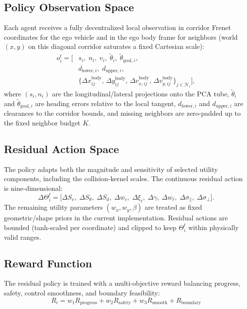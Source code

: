 \documentclass[conference]{IEEEtran}
\begin{document}
\subsection{Policy Observation Space}
Each agent receives a fully decentralized local observation in corridor Frenet coordinates for the ego vehicle and in the ego body frame for neighbors (world $(x,y)$ on this diagonal corridor saturates a fixed Cartesian scale):
\begin{equation}
\begin{aligned}
o_{i}^{t}
=
\Big[
&s_{i},\;n_{i},\;v_{i},\;\tilde\theta_{i},\;\tilde\theta_{\mathrm{goal},i},\\
&d_{\mathrm{lower},i},\;d_{\mathrm{upper},i},\\
&\big\{\Delta x^{\mathrm{body}}_{ij},\,\Delta y^{\mathrm{body}}_{ij},\,\Delta v_{x,ij}^{\mathrm{body}},\,\Delta v_{y,ij}^{\mathrm{body}}\big\}_{j\in\mathcal{N}_{i}}
\Big],
\end{aligned}
\end{equation}
where $(s_{i},n_{i})$ are the longitudinal/lateral projections onto the PCA tube, $\tilde\theta_{i}$ and $\tilde\theta_{\mathrm{goal},i}$ are heading errors relative to the local tangent, $d_{\mathrm{lower},i}$ and $d_{\mathrm{upper},i}$ are clearances to the corridor bounds, and missing neighbors are zero-padded up to the fixed neighbor budget $K$.

\subsection{Residual Action Space}
The policy adapts both the magnitude and sensitivity of selected utility components, including the collision-kernel scales. The continuous residual action is nine-dimensional:
\begin{equation}
\Delta\Theta_{i}^{t}
=
\big[
\Delta S_{v},\;
\Delta S_{\theta},\;
\Delta S_{d},\;
\Delta w_{c},\;
\Delta \xi_{i},\;
\Delta \gamma,\;
\Delta w_{\ell},\;
\Delta \sigma_{\parallel},\;
\Delta \sigma_{\perp}
\big].
\end{equation}
The remaining utility parameters $(w_{x},w_{y},\beta)$ are treated as fixed geometric/shape priors in the current implementation. Residual actions are bounded (tanh-scaled per coordinate) and clipped to keep $\Theta_{i}^{t}$ within physically valid ranges.

\subsection{Reward Function}
The residual policy is trained with a multi-objective reward balancing progress, safety, control smoothness, and boundary feasibility:
\begin{equation}
R_{i}=w_{1}R_{\mathrm{progress}}+w_{2}R_{\mathrm{safety}}+w_{3}R_{\mathrm{smooth}}+R_{\mathrm{boundary}}
\end{equation}
\end{document}
